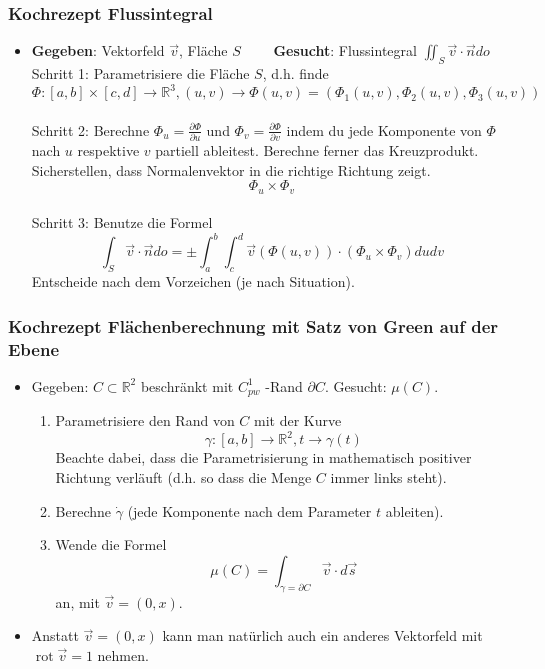 \documentclass[a3paper, 11pt, landscape]{scrartcl}
\DeclareMathOperator{\rot}{rot}
\begin{document}
\begin{multicols*}{3}
	\subsubsection{Kochrezept Flussintegral}
	\begin{itemize}
	    \item \textbf{Gegeben}: Vektorfeld \(\vec{v}\), Fläche \(S \quad\quad\) \textbf{Gesucht}: Flussintegral \(\iint_{S} \vec{v} \cdot \vec{n} d o\)\\
        Schritt 1: Parametrisiere die Fläche \(S\), d.h. finde
        $$
        \Phi:[a, b] \times[c, d] \rightarrow \mathbb{R}^{3},(u, v) \rightarrow \Phi(u, v)=\left(\Phi_{1}(u, v), \Phi_{2}(u, v), \Phi_{3}(u, v)\right)
        $$\\
        Schritt 2: Berechne \(\Phi_{u}=\frac{\partial \Phi}{\partial u}\) und \(\Phi_{v}=\frac{\partial \Phi}{\partial v}\) indem du jede Komponente von \(\Phi\) nach \(u\) respektive \(v\) partiell ableitest. Berechne ferner das Kreuzprodukt. Sicherstellen, dass Normalenvektor in die richtige Richtung zeigt.
        $$
        \Phi_{u} \times \Phi_{v}
        $$\\
        Schritt 3: Benutze die Formel
        $$
        \int_{S} \vec{v} \cdot \vec{n} d o=\pm \int_{a}^{b} \int_{c}^{d} \vec{v}(\Phi(u, v)) \cdot\left(\Phi_{u} \times \Phi_{v}\right) d u d v
        $$
        Entscheide nach dem Vorzeichen (je nach Situation).
	\end{itemize}
	
	\subsubsection{Kochrezept Flächenberechnung mit Satz von Green auf der Ebene}
	\begin{itemize}
	    \item Gegeben: \(C \subset \mathbb{R}^{2}\) beschränkt mit \(C_{p w}^{1}\) -Rand \(\partial C\). Gesucht: \(\mu(C)\).
	    
	    \begin{enumerate}
    	    \item Parametrisiere den Rand von \(C\) mit der Kurve
            $$\gamma:[a, b] \rightarrow \mathbb{R}^{2}, t \rightarrow \gamma(t)$$
            Beachte dabei, dass die Parametrisierung in mathematisch positiver Richtung verläuft (d.h. so dass die Menge \(C\) immer links steht).
            \item Berechne \(\dot{\gamma}\) (jede Komponente nach dem Parameter \(t\) ableiten).
            \item Wende die Formel $$\mu(C)=\int_{\gamma=\partial C} \vec{v} \cdot d \vec{s}$$ an, mit \(\vec{v}=(0, x)\).
    	\end{enumerate}
    	\item Anstatt $\vec{v}=(0,x)$ kann man natürlich auch ein anderes Vektorfeld mit $\rot \vec{v}=1$ nehmen.
	\end{itemize}
	

\end{multicols*}
\end{document}
